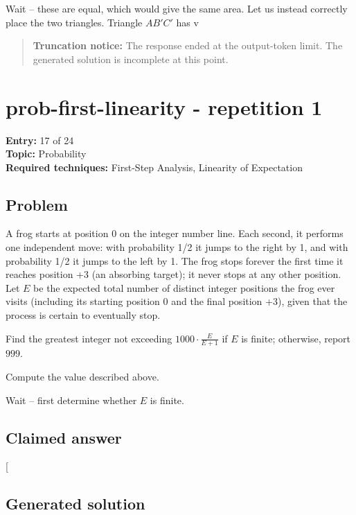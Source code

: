 \documentclass[
  11pt,
  letterpaper,
]{article}
\begin{document}
Wait -- these are equal, which would give the same area. Let us instead
correctly place the two triangles. Triangle \(AB'C'\) has v

\begin{quote}
\textbf{Truncation notice:} The response ended at the output-token
limit. The generated solution is incomplete at this point.
\end{quote}

\clearpage

\section{prob-first-linearity - repetition
1}\label{prob-first-linearity---repetition-1}

\textbf{Entry:} 17 of 24\\
\textbf{Topic:} Probability\\
\textbf{Required techniques:} First-Step Analysis, Linearity of
Expectation

\subsection{Problem}\label{problem-16}

A frog starts at position 0 on the integer number line. Each second, it
performs one independent move: with probability 1/2 it jumps to the
right by 1, and with probability 1/2 it jumps to the left by 1. The frog
stops forever the first time it reaches position +3 (an absorbing
target); it never stops at any other position. Let \(E\) be the expected
total number of distinct integer positions the frog ever visits
(including its starting position 0 and the final position +3), given
that the process is certain to eventually stop.

Find the greatest integer not exceeding \(1000 \cdot \frac{E}{E+1}\) if
\(E\) is finite; otherwise, report \(999\).

Compute the value described above.

Wait -- first determine whether \(E\) is finite.

\subsection{Claimed answer}\label{claimed-answer-16}

{[}\boxed{999}{]}

\subsection{Generated solution}\label{generated-solution-16}
\end{document}
